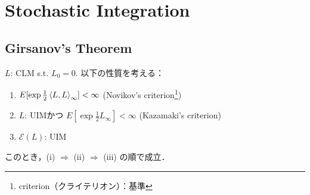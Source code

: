 \documentclass{jsarticle}
\title{}
\author{}
\date{
}
\begin{document}
\setcounter{section}{4}
\section{Stochastic Integration}
\setcounter{subsection}{4}
\subsection{Girsanov's Theorem}

\setcounter{thm}{22}
\begin{screen}
    \begin{thm}
    \label{thm:523}
        $L$: CLM s.t. $L_0=0.$
        以下の性質を考える：
        \begin{enumerate}[label=(\roman*)]
            \item
            $E[\exp\frac{1}{2}\left\langle L,L\right\rangle_{\infty}]<\infty$
            (Novikov's criterion\footnote{criterion（クライテリオン）：基準})
            \item
            $L$: UIMかつ $E[\exp\frac{1}{2}L_{\infty}]<\infty$
            (Kazamaki's criterion)
            \item
            $\mathcal{E}(L)$: UIM
        \end{enumerate}
        このとき，(i) $\Rightarrow$ (ii) $\Rightarrow$ (iii) の順で成立．
    \end{thm}
\end{screen}
\end{document}
